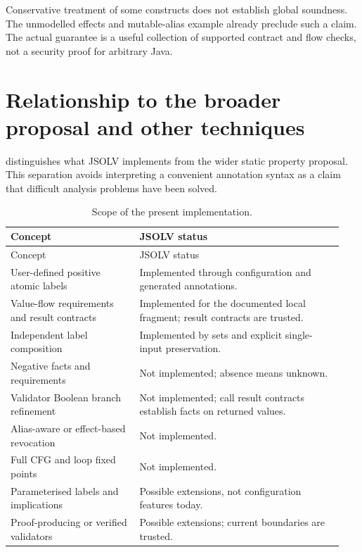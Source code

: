 \documentclass[11pt]{article}
\newcommand{\jsolv}{\textsc{JSOLV}}
\begin{document}
Conservative treatment of some constructs does not establish global soundness.
The unmodelled effects and mutable-alias example already preclude such a claim.
The actual guarantee is a useful collection of supported contract and flow
checks, not a security proof for arbitrary Java.

\section{Relationship to the broader proposal and other techniques}

 distinguishes what \jsolv{} implements from the wider static
property proposal. This separation avoids interpreting a convenient annotation
syntax as a claim that difficult analysis problems have been solved.

\begin{longtable}{@{}>{\raggedright\arraybackslash}p{0.36\linewidth}
                      >{\raggedright\arraybackslash}p{0.58\linewidth}@{}}
\caption{Scope of the present implementation.}\label{tab:scope}\\
\toprule
Concept & JSOLV status \\
\midrule
\endfirsthead
\toprule Concept & JSOLV status \\ \midrule
\endhead
User-defined positive atomic labels & Implemented through configuration and generated annotations. \\
Value-flow requirements and result contracts & Implemented for the documented local fragment; result contracts are trusted. \\
Independent label composition & Implemented by sets and explicit single-input preservation. \\
Negative facts and requirements & Not implemented; absence means unknown. \\
Validator Boolean branch refinement & Not implemented; call result contracts establish facts on returned values. \\
Alias-aware or effect-based revocation & Not implemented. \\
Full CFG and loop fixed points & Not implemented. \\
Parameterised labels and implications & Possible extensions, not configuration features today. \\
Proof-producing or verified validators & Possible extensions; current boundaries are trusted. \\
\bottomrule
\end{longtable}
\end{document}
